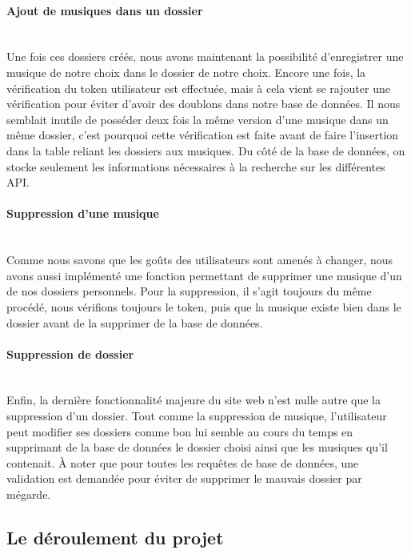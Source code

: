 \documentclass[12pt,french]{article}
\begin{document}
\paragraph{Ajout de musiques dans un dossier \\\\} 

Une fois ces dossiers créés, nous avons maintenant la possibilité d'enregistrer une musique de notre choix dans le dossier de notre choix. Encore une fois, la vérification du token utilisateur est effectuée, mais à cela vient se rajouter une vérification pour éviter d'avoir des doublons dans notre base de données. Il nous semblait inutile de posséder deux fois la même version d'une musique dans un même dossier, c'est pourquoi cette vérification est faite avant de faire l'insertion dans la table reliant les dossiers aux musiques. Du côté de la base de données, on stocke seulement les informations nécessaires à la recherche sur les différentes \gls{API}.

\paragraph{Suppression d'une musique \\\\}

Comme nous savons que les goûts des utilisateurs sont amenés à changer, nous avons aussi implémenté une fonction permettant de supprimer une musique d'un de nos dossiers personnels. Pour la suppression, il s'agit toujours du même procédé, nous vérifions toujours le token, puis que la musique existe bien dans le dossier avant de la supprimer de la base de données.

\paragraph{Suppression de dossier \\\\}

Enfin, la dernière fonctionnalité majeure du site web n'est nulle autre que la suppression d'un dossier. Tout comme la suppression de musique, l'utilisateur peut modifier ses dossiers comme bon lui semble au cours du temps en supprimant de la base de données le dossier choisi ainsi que les musiques qu'il contenait. À noter que pour toutes les requêtes de base de données, une validation est demandée pour éviter de supprimer le mauvais dossier par mégarde.

\subsection{Le déroulement du projet}
\end{document}
